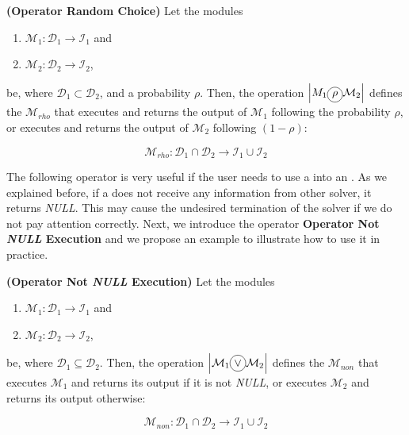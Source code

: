 \begin{definition}\label{op:rho}
{\bf (Operator Random Choice)} Let the modules
\begin{enumerate}%
	\item $\mathcal{M}_1 : \mathcal{D}_1 \rightarrow \mathcal{I}_1$ and  
	\item $\mathcal{M}_2 : \mathcal{D}_2 \rightarrow \mathcal{I}_2$,
\end{enumerate}%
be, where $\mathcal{D}_1 \subset \mathcal{D}_2$, %
and a probability $\rho$. Then, the operation $\left|M_1\circled{$\rho$}\mathcal{M}_2\right|$ defines the \cm{} $\mathcal{M}_{rho}$ that executes and returns the output of $\mathcal{M}_1$ following the probability $\rho$, or executes and returns the output of $\mathcal{M}_2$ following $(1-\rho)$:

\[
\mathcal{M}_{rho}:\mathcal{D}_1\cap\mathcal{D}_2 \rightarrow \mathcal{I}_1 \cup \mathcal{I}_2 
\]
\end{definition}

The following operator is very useful if the user needs to use a \opch{} into an \as{}. As we explained before, if a \opch{} does not receive any information from other solver, it returns {\it NULL}. This may cause the undesired termination of the solver if we do not pay attention correctly. Next, we introduce the operator \textbf{Operator Not {\it NULL} Execution} and we propose an example to illustrate how to use it in practice.

\begin{definition}\label{op:or}
{\bf (Operator Not {\it NULL} Execution)} Let the modules
\begin{enumerate}%
	\item $\mathcal{M}_1 : \mathcal{D}_1 \rightarrow \mathcal{I}_1$ and  
	\item $\mathcal{M}_2 : \mathcal{D}_2 \rightarrow \mathcal{I}_2$,
\end{enumerate}%
be, where $\mathcal{D}_1 \subseteq \mathcal{D}_2$. %
Then, the operation $\left|\mathcal{M}_1\circled{$\vee$}\mathcal{M}_2\right|$ defines the \cm{} $\mathcal{M}_{non}$ that executes $\mathcal{M}_1$ and returns its output if it is not {\it NULL}, or executes $\mathcal{M}_2$ and returns its output otherwise:

\[
\mathcal{M}_{non}:\mathcal{D}_1\cap\mathcal{D}_2 \rightarrow \mathcal{I}_1 \cup \mathcal{I}_2 
\]
\end{definition}

